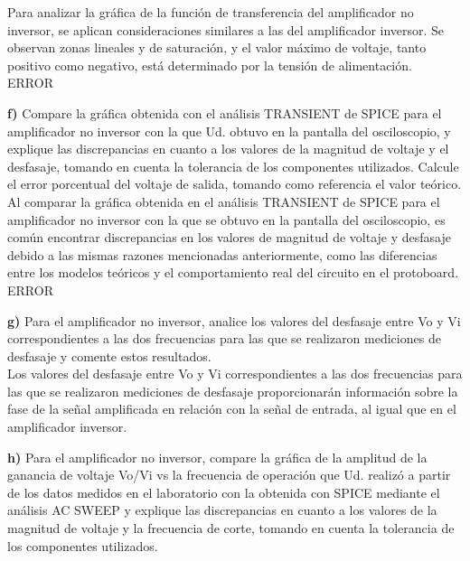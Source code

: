 \documentclass[12pt]{article}
\begin{document}
	Para analizar la gráfica de la función de transferencia del amplificador no inversor, se aplican consideraciones similares a las del amplificador inversor. Se observan zonas lineales y de saturación, y el valor máximo de voltaje, tanto positivo como negativo, está determinado por la tensión de alimentación.\\
	
	ERROR
	
	\noindent \textbf{f)} Compare la gráfica obtenida con el análisis TRANSIENT de SPICE para el amplificador no inversor con la que Ud. obtuvo en la pantalla del osciloscopio, y explique las discrepancias en cuanto a los valores de la magnitud de voltaje y el desfasaje, tomando en cuenta la tolerancia de los componentes utilizados. Calcule el error porcentual del voltaje de salida, tomando como referencia el valor teórico.\\
	
	Al comparar la gráfica obtenida en el análisis TRANSIENT de SPICE para el amplificador no inversor con la que se obtuvo en la pantalla del osciloscopio, es común encontrar discrepancias en los valores de magnitud de voltaje y desfasaje debido a las mismas razones mencionadas anteriormente, como las diferencias entre los modelos teóricos y el comportamiento real del circuito en el protoboard.\\
	
	ERROR
	
	\noindent \textbf{g)} Para el amplificador no inversor, analice los valores del desfasaje entre Vo y Vi correspondientes a las dos frecuencias para las que se realizaron mediciones de desfasaje y comente estos resultados.\\
	
	Los valores del desfasaje entre Vo y Vi correspondientes a las dos frecuencias para las que se realizaron mediciones de desfasaje proporcionarán información sobre la fase de la señal amplificada en relación con la señal de entrada, al igual que en el amplificador inversor.
	
	\noindent \textbf{h)} Para el amplificador no inversor, compare la gráfica de la amplitud de la ganancia de voltaje Vo/Vi vs la frecuencia de operación que Ud. realizó a partir de los datos	medidos en el laboratorio con la obtenida con SPICE mediante el análisis AC SWEEP y explique las discrepancias en cuanto a los valores de la magnitud de voltaje y la frecuencia de corte, tomando en cuenta la tolerancia de los componentes utilizados.\\
	
\end{document}
